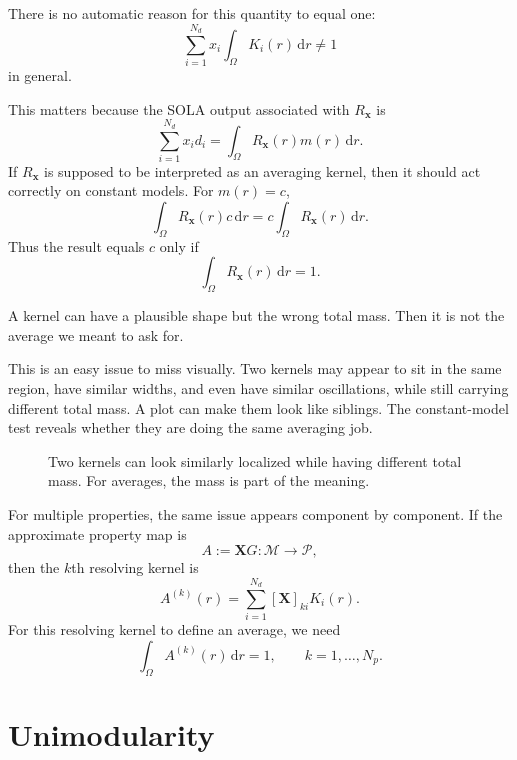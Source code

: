 \documentclass[11pt,openany]{book}
\theoremstyle{definition}
\theoremstyle{remark}
\newcommand{\M}{\mathcal M}
\newcommand{\Pspace}{\mathcal P}
\newcommand{\dd}{\,\mathrm d}
\begin{document}
There is no automatic reason for this quantity to equal one:
\[
  \sum_{i=1}^{N_d}
  x_i
  \int_\Omega K_i(r)\dd r
  \neq 1
\]
in general.

This matters because the SOLA output associated with \(R_{\mathbf x}\) is
\[
  \sum_{i=1}^{N_d}x_id_i
  =
  \int_\Omega R_{\mathbf x}(r)m(r)\dd r.
\]
If \(R_{\mathbf x}\) is supposed to be interpreted as an averaging kernel, then it should act
correctly on constant models. For \(m(r)=c\),
\[
  \int_\Omega R_{\mathbf x}(r)c\dd r
  =
  c\int_\Omega R_{\mathbf x}(r)\dd r.
\]
Thus the result equals \(c\) only if
\[
  \int_\Omega R_{\mathbf x}(r)\dd r=1.
\]

\begin{warningbox}
A kernel can have a plausible shape but the wrong total mass. Then it is not the average we
meant to ask for.
\end{warningbox}

This is an easy issue to miss visually. Two kernels may appear to sit in the same region, have
similar widths, and even have similar oscillations, while still carrying different total mass. A
plot can make them look like siblings. The constant-model test reveals whether they are doing
the same averaging job.

\begin{figure}[ht]
  \centering
  \caption{Two kernels can look similarly localized while having different total mass. For
  averages, the mass is part of the meaning.}
  \label{fig:act3-wrong-mass}
\end{figure}

For multiple properties, the same issue appears component by component. If the approximate
property map is
\[
  A:=\mathbf XG:\M\to\Pspace,
\]
then the \(k\)th resolving kernel is
\[
  A^{(k)}(r)
  =
  \sum_{i=1}^{N_d}[\mathbf X]_{ki}K_i(r).
\]
For this resolving kernel to define an average, we need
\[
  \int_\Omega A^{(k)}(r)\dd r=1,
  \qquad k=1,\dots,N_p.
\]

\section{Unimodularity}
\end{document}
